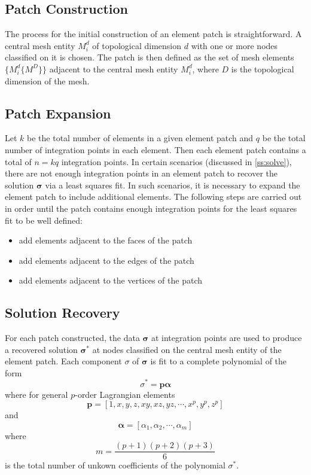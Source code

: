 \documentclass{article}
\begin{document}
\subsection{Patch Construction}
The process for the initial construction of an element patch is 
straightforward. A central mesh entity $M^d_i$ of topological dimension $d$
with one or more nodes classified on it is chosen. The patch is then
defined as the set of mesh elements $\{M^d_i\{M^D\}\}$ adjacent to the 
central mesh entity $M^d_i$, where $D$ is the topological dimension of the
mesh.

\subsection{Patch Expansion}
Let $k$ be the total number of elements in a given element patch and $q$ be
the total number of integration points in each element. Then each element 
patch contains a total of $n = kq$ integration points. In certain scenarios
(discussed in \ref{ss:solve}), there are not enough integration points in
an element patch to recover the solution $\boldsymbol{\sigma}$ via a least
squares fit. In such scenarios, it is necessary to expand the element patch
to include additional elements. The following steps are carried out in
order until the patch contains enough integration points for the least
squares fit to be well defined:
\begin{itemize}
\item add elements adjacent to the faces of the patch
\item add elements adjacent to the edges of the patch
\item add elements adjacent to the vertices of the patch 
\end{itemize}

\subsection{Solution Recovery}
For each patch constructed, the data $\boldsymbol{\sigma}$ at integration 
points are used to produce a recovered solution $\boldsymbol{\sigma}^*$
at nodes classified on the central mesh entity of the element patch. Each
component $\sigma$ of $\boldsymbol{\sigma}$ is fit to a complete polynomial
of the form
 \[
\sigma^* = \textbf{p} \boldsymbol{\alpha}
\]
where for general $p$-order Lagrangian elements
\[
\textbf{p} = \left[ 1,x,y,z,xy,xz,yz,\cdots,x^p,y^p,z^p \right] 
\]
and 
\[
\boldsymbol{\alpha} = \left[ \alpha_1, \alpha_2, \cdots, \alpha_m \right]
\]
where
\[
m = \frac{(p+1)(p+2)(p+3)}{6}
\]
is the total number of unkown coefficients of the polynomial $\sigma^*$.
\end{document}
